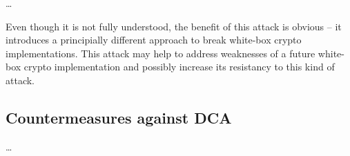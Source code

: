 \ldots

Even though it is not fully understood, the benefit of this attack is obvious -- it introduces a principially different approach to break white-box crypto implementations. This attack may help to address weaknesses of a future white-box crypto implementation and possibly increase its resistancy to this kind of attack.

\subsection{Countermeasures against DCA}

\ldots

